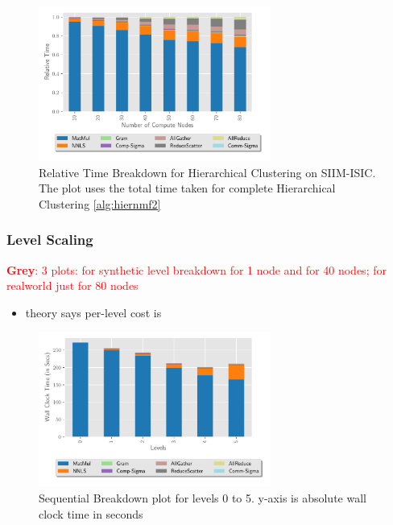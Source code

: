 \documentclass[conference,compsoc]{IEEEtran}
\newcommand{\GB}[1]{\textcolor{red}{\textbf{Grey}: #1}}
\newcommand{\image}{SIIM-ISIC}
\begin{document}
\begin{figure}
\begin{center}
\includegraphics[height=2in, width=\columnwidth]{plots/realworld_hier_strongscaling.pdf}
\caption{Relative Time Breakdown for Hierarchical Clustering on \image{}. The plot uses the total time taken for complete Hierarchical Clustering \cref{alg:hiernmf2}}
\label{fig:rwhierstrongscaling}
\end{center}
\end{figure}

\subsubsection{Level Scaling}

\GB{3 plots: for synthetic level breakdown for 1 node and for 40 nodes; for realworld just for 80 nodes}

\begin{itemize}
	\item theory says per-level cost is 
\end{itemize}

\begin{figure}
\begin{center}
\includegraphics[height=2in, width=\columnwidth]{plots/synthetic_sequential_level_breakdown.pdf}
\caption{Sequential Breakdown plot for levels 0 to 5. y-axis is absolute wall clock time in seconds}
\label{fig:seqlevelbreakdown}
\end{center}
\end{figure}
\end{document}
